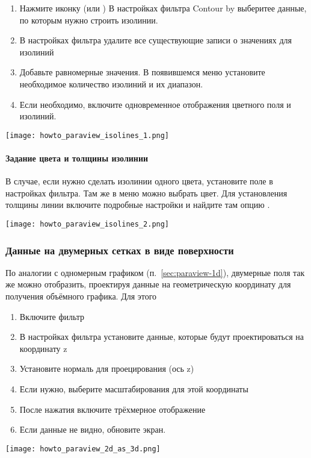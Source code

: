 \begin{enumerate}
\item Нажмите иконку  (или )
      В настройках фильтра Contour by выберитее данные, по которым нужно строить изолинии.
\item В настройках фильтра удалите все существующие записи о значениях для изолиний
\item Добавьте равномерные значения. В появившемся меню установите необходимое количество изолиний и их диапазон.
\item Если необходимо, включите одновременное отображения цветного поля и изолиний.
\end{enumerate}

\begin{center}
\texttt{[image: howto\_paraview\_isolines\_1.png]}
\end{center}

\paragraph{Задание цвета и толщины изолинии}
В случае, если нужно сделать изолинии одного цвета, установите поле  в 
настройках фильтра. Там же в меню  можно выбрать цвет.
Для установления толщины линии включите подробные настройки и найдите там опцию .
\begin{center}
\texttt{[image: howto\_paraview\_isolines\_2.png]}
\end{center}

\subsubsection{Данные на двумерных сетках в виде поверхности}
\label{sec:paraview-2d}

По аналогии с  одномерным графиком (п.~\ref{sec:paraview-1d}), двумерные поля так же
можно отобразить, проектируя данные на геометрическую координату для получения
объёмного графика. Для этого
\begin{enumerate}
\item Включите фильтр 
\item В настройках фильтра установите данные, которые будут проектироваться на координату z
\item Установите нормаль для проецирования (ось z)
\item Если нужно, выберите масштабирования для этой координаты
\item После нажатия  включите трёхмерное отображение
\item Если данные не видно, обновите экран.
\end{enumerate}
\begin{center}
\texttt{[image: howto\_paraview\_2d\_as\_3d.png]}
\end{center}

